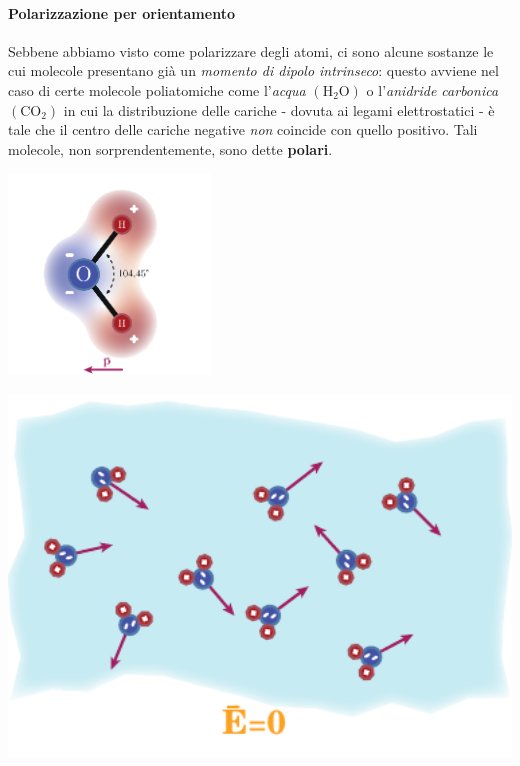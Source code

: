 \paragraph{Polarizzazione per orientamento}
Sebbene abbiamo visto come polarizzare degli atomi, ci sono alcune sostanze le cui molecole presentano già un \textit{momento di dipolo intrinseco}: questo avviene nel caso di certe molecole poliatomiche come l'\textit{acqua} $\left(\mathrm{H}_2\mathrm{O}\right)$ o l'\textit{anidride carbonica} $\left(\mathrm{CO}_2\right)$ in cui la distribuzione delle cariche - dovuta ai legami elettrostatici - è tale che il centro delle cariche negative \textit{non} coincide con quello positivo. Tali molecole, non sorprendentemente, sono dette \textbf{polari}.
\begin{center}
	\includegraphics[width=0.4\textwidth]{images/chp6/chp6molecolaacqua.pdf}
\end{center}
\begin{minipage}{0.39\textwidth}
	\begin{center}
		\includegraphics[width=1\textwidth]{images/chp6/chp6orientamento1.pdf}
	\end{center}
\end{minipage}\hspace{5pt}
